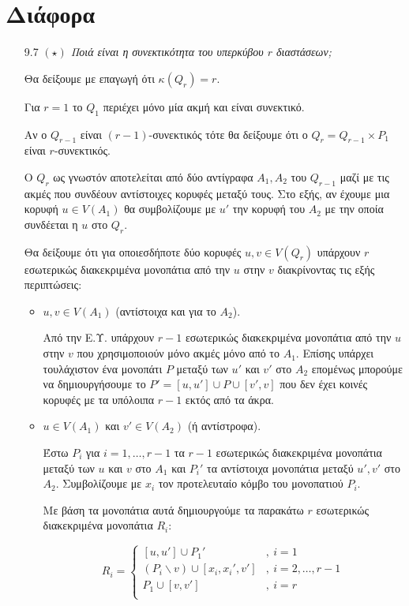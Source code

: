 \documentclass[a4paper, oneside, 11pt]{article}
\theoremstyle{definition}
\begin{document}
\section{Διάφορα}

\begin{enumerate}
   \item[9.7] \emph{$(\star)$ Ποιά είναι η συνεκτικότητα του υπερκύβου
   $r$ διαστάσεων;}

   Θα δείξουμε με επαγωγή ότι $\kappa(Q_r) = r$.

   Για $r = 1$ το $Q_1$ περιέχει μόνο μία ακμή και είναι συνεκτικό.

   Αν ο $Q_{r-1}$ είναι $(r-1)$-συνεκτικός τότε θα δείξουμε ότι
   ο $Q_r = Q_{r-1} \times P_1$ είναι $r$-συνεκτικός.

   Ο $Q_r$ ως γνωστόν αποτελείται από δύο αντίγραφα $A_1, A_2$ του $Q_{r-1}$
   μαζί με τις ακμές που συνδέουν αντίστοιχες κορυφές μεταξύ τους.
   Στο εξής, αν έχουμε μια κορυφή $u \in V(A_1)$ θα συμβολίζουμε
   με $u'$ την κορυφή του $A_2$ με την οποία συνδέεται η $u$ στο
   $Q_r$.

   Θα δείξουμε ότι για οποιεσδήποτε δύο κορυφές $u, v \in V(Q_r)$
   υπάρχουν $r$ εσωτερικώς διακεκριμένα μονοπάτια από την $u$ στην
   $v$ διακρίνοντας τις εξής περιπτώσεις:

   \begin{itemize}
      \item $u, v \in V(A_1)$ (αντίστοιχα και για το $A_2$).

      Από την Ε.Υ. υπάρχουν $r-1$ εσωτερικώς διακεκριμένα μονοπάτια
      από την $u$ στην $v$ που χρησιμοποιούν μόνο ακμές μόνο από το
      $A_1$. Επίσης υπάρχει τουλάχιστον ένα μονοπάτι $P$ μεταξύ των
      $u'$ και $v'$ στο $A_2$ επομένως μπορούμε να δημιουργήσουμε
      το $P' = [u, u'] \cup P \cup [v', v]$ που δεν έχει κοινές κορυφές με
      τα υπόλοιπα $r-1$ εκτός από τα άκρα.

      \item $u \in V(A_1)$ και $v' \in V(A_2)$ (ή αντίστροφα).

      Έστω $P_i$ για $i = 1, \ldots, r-1$ τα $r-1$ εσωτερικώς
      διακεκριμένα μονοπάτια μεταξύ των $u$ και $v$ στο $A_1$ και
      $P_i'$ τα αντίστοιχα μονοπάτια μεταξύ $u', v'$ στο $A_2$. Συμβολίζουμε με
      $x_i$ τον προτελευταίο κόμβο του μονοπατιού $P_i$.

      Με βάση τα μονοπάτια αυτά δημιουργούμε τα παρακάτω $r$
      εσωτερικώς διακεκριμένα μονοπάτια $R_i$:

      \begin{equation*}
         R_i = \left\{
            \begin{array}{cl}
               [u, u']\cup P_1' &, \ i = 1\\
               (P_i \backslash v) \cup [x_i, x_i', v'] &, \ i = 2, \ldots, r-1\\
               P_1 \cup [v, v'] &,\ i = r\\
            \end{array}
            \right.
      \end{equation*}


\end{itemize}
\end{enumerate}
\end{document}
